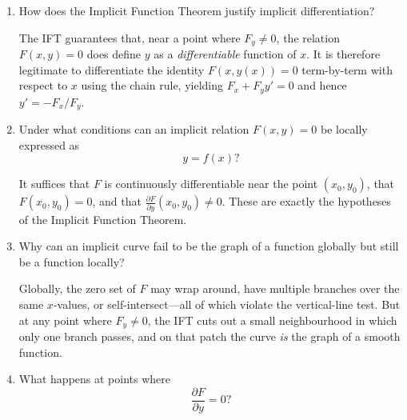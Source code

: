 \documentclass{self-check}
\begin{document}
\begin{enumerate}[leftmargin=*, itemsep=8pt]
    \begin{answer}
      Let $F:\R^2\to\R$ be continuously differentiable
      near $(x_0,y_0)$ with $F(x_0,y_0)=0$ and $\frac{\partial
      F}{\partial y}(x_0,y_0)\neq 0$. Then there exist an open interval
      $U\ni x_0$ and a unique continuously differentiable function $f :
      U \to \R$ such that $f(x_0)=y_0$ and \[ F(x,f(x))=0 \quad
      \text{for all} x\in U. \] Moreover, $f'(x)=-F_x(x,f(x))/F_y(x,f(x))$.
    \end{answer}

  \item How does the Implicit Function Theorem justify implicit differentiation?

    \begin{answer} The IFT guarantees that, near a point where
      $F_y\neq 0$, the relation $F(x,y)=0$ does define $y$ as a
      \emph{differentiable} function of $x$.  It is therefore
      legitimate to differentiate the identity $F(x,y(x))=0$
      term-by-term with respect to $x$ using the chain rule, yielding
      $F_x + F_y y'=0$ and hence $y'=-F_x/F_y$.
    \end{answer}

  \item Under what conditions can an implicit relation $F(x,y)=0$ be
    locally expressed as \[ y=f(x)? \]

    \begin{answer} It suffices that $F$ is continuously
      differentiable near the point $(x_0,y_0)$, that $F(x_0,y_0)=0$,
      and that $\frac{\partial F}{\partial y}(x_0,y_0)\neq 0$.  These
      are exactly the hypotheses of the Implicit Function Theorem.
    \end{answer}

  \item Why can an implicit curve fail to be the graph of a function
    globally but still be a function locally?

    \begin{answer} Globally, the zero set of $F$ may wrap around,
      have multiple branches over the same $x$-values, or
      self-intersect---all of which violate the vertical-line test.
      But at any point where $F_y\neq 0$, the IFT cuts out a small
      neighbourhood in which only one branch passes, and on that patch
      the curve \emph{is} the graph of a smooth function.
    \end{answer}

  \item What happens at points where \[ \frac{\partial F}{\partial y}=0? \]


\end{enumerate}
\end{document}
